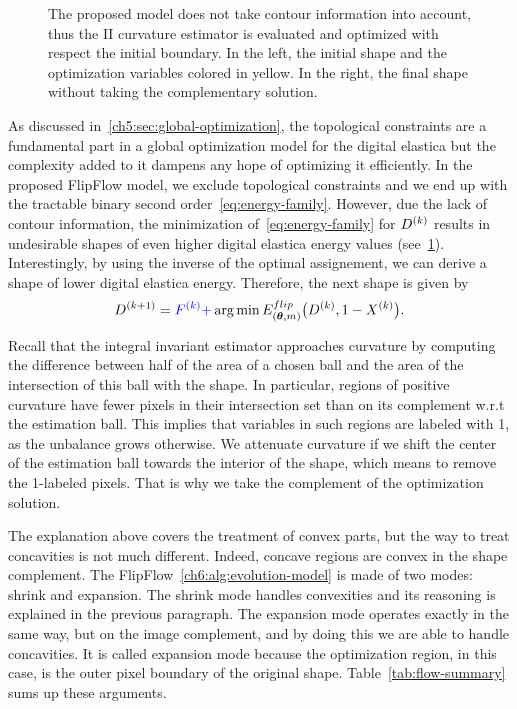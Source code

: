 \begin{figure}
\begin{minipage}{0.49\textwidth}
\label{ch6:fig:contour-info-2}
\end{minipage}%
\caption{  The proposed model does not take contour information into account, thus the II curvature estimator is evaluated and optimized with respect the initial boundary. In the left, the initial shape and the optimization variables colored in yellow. In the right, the final shape without taking the complementary solution.}
\label{ch6:fig:contour-info}
\end{figure}
 As discussed in~\cref{ch5:sec:global-optimization}, the topological constraints are a fundamental part in a global optimization model for the digital elastica but the complexity added to it dampens any hope of optimizing it efficiently. In the proposed FlipFlow model, we exclude topological constraints and we end up with the tractable binary second order~\cref{eq:energy-family}. However, due the lack of contour information, the minimization of~\cref{eq:energy-family} for $D^{(k)}$ results in undesirable shapes of even higher digital elastica energy values  (see~\cref{ch6:fig:contour-info}). Interestingly, by using the inverse of the optimal assignement, we can derive a shape of lower digital elastica energy. Therefore, the next shape is given by
\begin{align*}
	D^{(k+1)} = {\color{blue}{F^{(k)} + }} \operatorname*{arg\,min} _{}{E_{(\bm{\theta},m)}^{flip}\big(D^{(k)},1-X^{(k)}} \big).
\end{align*}
%
Recall that the integral invariant estimator approaches curvature by computing the difference between half of the area
of a chosen ball and the area of the intersection of this ball with the shape.  In particular, regions of positive
curvature have fewer pixels in their intersection set than on its complement w.r.t the estimation ball. This implies
that variables in such regions are labeled with 1, as the unbalance grows otherwise. We attenuate curvature if we shift
the center of the estimation ball towards the interior of the shape, which means to remove the 1-labeled pixels. That is
why we take the complement of the optimization solution.


The explanation above covers the treatment of convex parts, but the way to treat concavities is not much different. Indeed, concave regions are convex in the shape complement. The FlipFlow~\cref{ch6:alg:evolution-model} is made of two modes: shrink and expansion. The shrink mode handles convexities and its reasoning is explained in the previous paragraph. The expansion mode operates exactly in the same way, but on the image complement, and by doing this we are able to handle
concavities. It is called expansion mode because the optimization region, in this case, is the outer pixel boundary of
the original shape. Table~\cref{tab:flow-summary} sums up these arguments.


